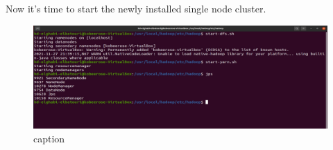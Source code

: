 \begin{spacing}{1.2}
\par Now it's time to start the newly installed single node cluster. 
\\
\begin{figure}[!htb] 
\begin{center} 
\includegraphics[width=1\linewidth]{Big_Data/Hadoop/Apache Hadoop Installation/Starting 1node Cluster.jpg} 
\end{center} 
\caption{caption} 
\end{figure} 
\FloatBarrier


\end{spacing}
